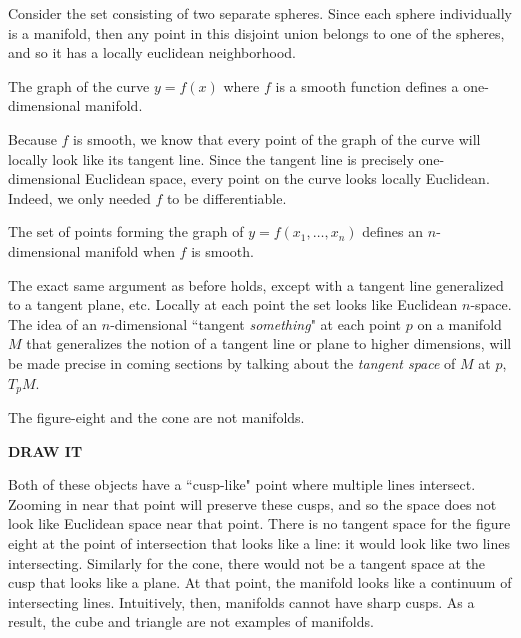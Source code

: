 	Consider the set consisting of two separate spheres. Since each sphere individually is a manifold, then any point in this disjoint union belongs to one of the spheres, and so it has a locally euclidean neighborhood.
	
	\begin{example}
		The graph of the curve $y=f(x)$ where $f$ is a smooth function defines a one-dimensional manifold.
	\end{example}
	
	Because $f$ is smooth, we know that every point of the graph of the curve will locally look like its tangent line. Since the tangent line is precisely one-dimensional Euclidean space, every point on the curve looks locally Euclidean. Indeed, we only needed $f$ to be differentiable.
	
	\begin{example}
		The set of points forming the graph of $y = f(x_1, \dots, x_n)$ defines an $n$-dimensional manifold when $f$ is smooth.
	\end{example}
	
	The exact same argument as before holds, except with a tangent line generalized to a tangent plane, etc. Locally at each point the set looks like Euclidean $n$-space. The idea of an $n$-dimensional ``tangent \emph{something}" at each point $p$ on a manifold $M$ that generalizes the notion of a tangent line or plane to higher dimensions, will be made precise in coming sections by talking about the \emph{tangent space} of $M$ at $p$, $T_p M$.

	
	\begin{example}
		The figure-eight and the cone are not manifolds.
	\end{example}
	
	\textbf{DRAW IT}
	
	Both of these objects have a ``cusp-like" point where multiple lines intersect. Zooming in near that point will preserve these cusps, and so the space does not look like Euclidean space near that point. There is no tangent space for the figure eight at the point of intersection that looks like a line: it would look like two lines intersecting. Similarly for the cone, there would not be a tangent space at the cusp that looks like a plane. At that point, the manifold looks like a continuum of intersecting lines. Intuitively, then, manifolds cannot have sharp cusps. As a result, the cube and triangle are not examples of manifolds. \\
	

